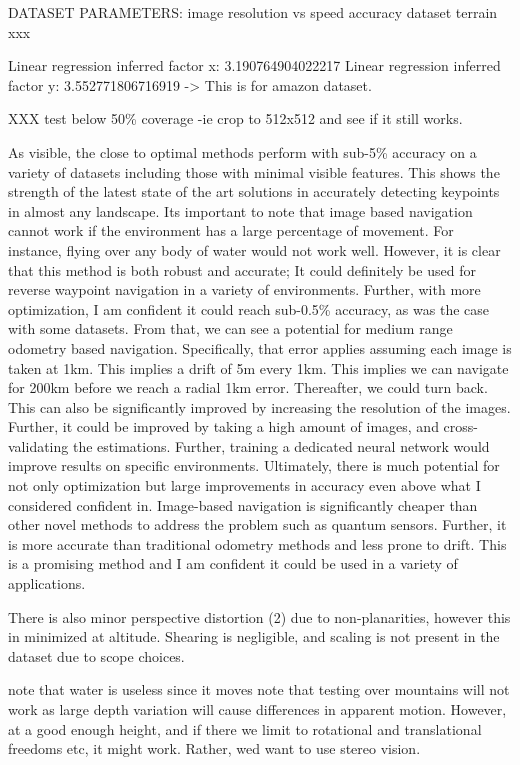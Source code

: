 DATASET PARAMETERS:
image resolution vs speed accuracy
dataset terrain
xxx


Linear regression inferred factor x: 3.190764904022217
Linear regression inferred factor y: 3.552771806716919 -> This is for amazon dataset.


XXX test below 50\% coverage -ie crop to 512x512 and see if it still works.


As visible, the close to optimal methods perform with sub-5\% accuracy on a variety of datasets including those with minimal visible features. This shows the strength of the latest state of the art solutions in accurately detecting keypoints in almost any landscape. Its important to note that image based navigation cannot work if the environment has a large percentage of movement. For instance, flying over any body of water would not work well. However, it is clear that this method is both robust and accurate; It could definitely be used for reverse waypoint navigation in a variety of environments. Further, with more optimization, I am confident it could reach sub-0.5\% accuracy, as was the case with some datasets. From that, we can see a potential for medium range odometry based navigation. Specifically, that error applies assuming each image is taken at 1km. This implies a drift of 5m every 1km. This implies we can navigate for 200km before we reach a radial 1km error. Thereafter, we could turn back. This can also be significantly improved by increasing the resolution of the images. Further, it could be improved by taking a high amount of images, and cross-validating the estimations. Further, training a dedicated neural network would improve results on specific environments. Ultimately, there is much potential for not only optimization but large improvements in accuracy even above what I considered confident in. Image-based navigation is significantly cheaper than other novel methods to address the problem such as quantum sensors. Further, it is more accurate than traditional odometry methods and less prone to drift. This is a promising method and I am confident it could be used in a variety of applications.





There is also minor perspective distortion (2) due to non-planarities, however this in minimized at altitude. Shearing is negligible, and scaling is not present in the dataset due to scope choices. 


note that water is useless since it moves
note that testing over mountains will not work as large depth variation will cause differences in apparent motion. However, at a good enough height, and if there we limit to rotational and translational freedoms etc, it might work. Rather, wed want to use stereo vision. 

